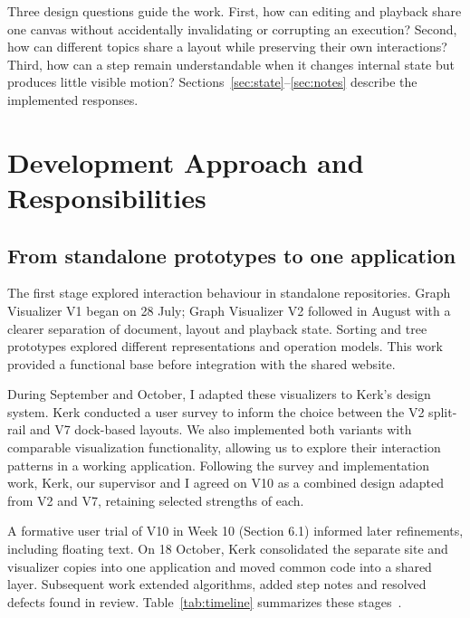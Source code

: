 \documentclass[11pt,a4paper]{article}
\newcommand{\page}{\par\vspace{8pt}}
\begin{document}
Three design questions guide the work. First, how can editing and playback share one canvas without accidentally invalidating or corrupting an execution? Second, how can different topics share a layout while preserving their own interactions? Third, how can a step remain understandable when it changes internal state but produces little visible motion? Sections~\ref{sec:state}--\ref{sec:notes} describe the implemented responses.

\page
\section{Development Approach and Responsibilities}\label{sec:approach}
\subsection{From standalone prototypes to one application}
The first stage explored interaction behaviour in standalone repositories. Graph Visualizer V1 began on 28 July; Graph Visualizer V2 followed in August with a clearer separation of document, layout and playback state. Sorting and tree prototypes explored different representations and operation models. This work provided a functional base before integration with the shared website.

During September and October, I adapted these visualizers to Kerk's design system. Kerk conducted a user survey to inform the choice between the V2 split-rail and V7 dock-based layouts. We also implemented both variants with comparable visualization functionality, allowing us to explore their interaction patterns in a working application. Following the survey and implementation work, Kerk, our supervisor and I agreed on V10 as a combined design adapted from V2 and V7, retaining selected strengths of each.



A formative user trial of V10 in Week 10 (Section 6.1) informed later refinements, including floating text. On 18 October, Kerk consolidated the separate site and visualizer copies into one application and moved common code into a shared layer. Subsequent work extended algorithms, added step notes and resolved defects found in review. Table~\ref{tab:timeline} summarizes these stages~\cite{evidence,architecture}.
\end{document}
